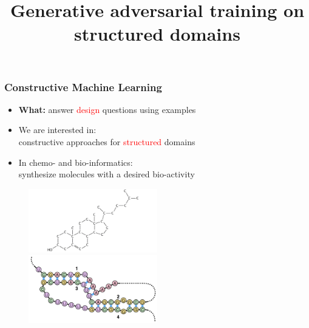 \documentclass{beamer}
\title 
{Generative adversarial training on \\ structured domains}
\author %
{\underline{Stefan Mautner} \and Fabrizio Costa 
    \small{ 
        \texttt{
            \href{mailto:mautner@informatik.uni-freiburg.de}
            {mautner@informatik.uni-freiburg.de}
        }
        \texttt{
            \href{mailto:f.costa@exeter.ac.uk}
            {f.costa@exeter.ac.uk}
        }
   }
}
\date
\newcommand{\red}[1]{\textcolor{red}{#1}}
\begin{document}
\frame{\titlepage}



\begin{frame}
\frametitle{Constructive Machine Learning}

    \begin{itemize}
        \item {\bf What:} answer \red{design} questions using examples
        \item We are interested in: \\
        constructive approaches for \red{structured} domains
        \item In chemo- and bio-informatics: \\
        synthesize molecules with a desired bio-activity
    \end{itemize}
    \begin{figure}
        \centering
        \includegraphics[width=0.5\textwidth]{images/mol.jpg}
        \includegraphics[width=0.5\textwidth]{images/rna.png}
    \end{figure}    
\end{frame}




\end{document}
